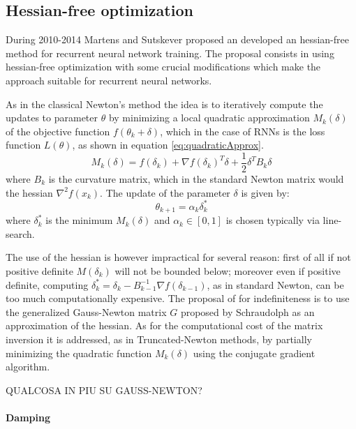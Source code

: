 \subsection{Hessian-free optimization}

During 2010-2014 Martens and Sutskever\cite{hessianFree} proposed an developed an hessian-free method for recurrent neural network training.
The proposal consists in using hessian-free optimization with some crucial modifications which make the approach suitable for recurrent neural networks.

As in  the classical Newton's method the idea is to iteratively compute the updates to parameter $\theta$ by minimizing a local quadratic approximation $M_{k}(\delta)$ of the objective function $f(\theta_k +\delta)$, which in the case of RNNs is the loss function $L(\theta)$, as shown in equation \ref{eq:quadraticApprox}.
\begin{equation}
 M_{k}(\delta) = f(\delta_{k})+\nabla f(\delta_{k})^T \delta +\frac{1}{2}\delta^T B_{k}\delta
 \label{eq:quadraticApprox}
\end{equation}
where $B_k$ is the curvature matrix, which in the standard Newton matrix would the hessian $\nabla^2f(x_k)$.
The update of the parameter $\delta$ is given by:
\begin{equation}
 \theta_{k+1} = \alpha_k\delta_k^* 
\end{equation}
where $\delta_k^*$ is the minimum $M_k(\delta)$ and $\alpha_k\in[0,1]$ is chosen typically via line-search. 

The use of the hessian is however impractical for several reason: first of all if not positive definite $M(\delta_k)$ will not be bounded below; moreover even if positive definite, computing $\delta_k^* = \delta_k - B_{k-1}^{-1}\nabla f(\delta_{k-1})$, as in standard Newton, can be too much computationally expensive.
The proposal of \cite{hessianFree} for indefiniteness is to use the generalized Gauss-Newton matrix $G$ proposed by Schraudolph\cite{gaussNewtonMatrix} as an approximation of the hessian. As for the computational cost of the matrix inversion it is addressed, as in Truncated-Newton methods, by partially minimizing the quadratic function $M_{k}(\delta)$ using the conjugate gradient algorithm.

QUALCOSA IN PIU SU GAUSS-NEWTON?

\paragraph{Damping}

